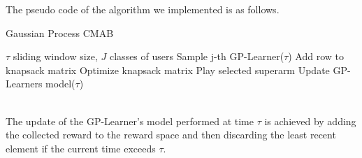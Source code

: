 The pseudo code of the algorithm we implemented is as follows.
\begin{algorithm}
	\caption{Gaussian Process CMAB}
	\begin{algorithmic}[1]
		\renewcommand{\algorithmicrequire}{\textbf{Input:}}
		\REQUIRE $\tau$ sliding window size, $J$ classes of users
			\STATE Sample j-th GP-Learner($\tau$)
			\STATE Add row to knapsack matrix
			\ENDFOR
			\STATE Optimize knapsack matrix
			\STATE Play selected superarm
			\STATE Update GP-Learners model($\tau$)
		\ENDFOR
	\end{algorithmic}
\end{algorithm}
\\The update of the GP-Learner's model performed at time $\tau$ is achieved by adding the collected reward to the reward space and then discarding the least recent element if the current time exceeds $\tau$.